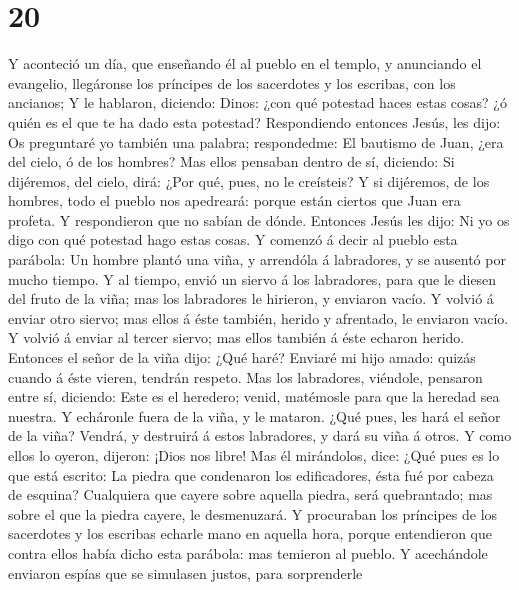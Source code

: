 \hypertarget{section-19}{%
\section{20}\label{section-19}}

 Y aconteció un día, que enseñando él al pueblo en el
templo, y anunciando el evangelio, llegáronse los príncipes de los
sacerdotes y los escribas, con los ancianos;  Y le hablaron,
diciendo: Dinos: ¿con qué potestad haces estas cosas? ¿ó quién es el que
te ha dado esta potestad?  Respondiendo entonces Jesús, les
dijo: Os preguntaré yo también una palabra; respondedme:  El
bautismo de Juan, ¿era del cielo, ó de los hombres?  Mas
ellos pensaban dentro de sí, diciendo: Si dijéremos, del cielo, dirá:
¿Por qué, pues, no le creísteis?  Y si dijéremos, de los
hombres, todo el pueblo nos apedreará: porque están ciertos que Juan era
profeta.  Y respondieron que no sabían de dónde.
 Entonces Jesús les dijo: Ni yo os digo con qué potestad
hago estas cosas.  Y comenzó á decir al pueblo esta
parábola: Un hombre plantó una viña, y arrendóla á labradores, y se
ausentó por mucho tiempo.  Y al tiempo, envió un siervo á
los labradores, para que le diesen del fruto de la viña; mas los
labradores le hirieron, y enviaron vacío.  Y volvió á
enviar otro siervo; mas ellos á éste también, herido y afrentado, le
enviaron vacío.  Y volvió á enviar al tercer siervo; mas
ellos también á éste echaron herido.  Entonces el señor de
la viña dijo: ¿Qué haré? Enviaré mi hijo amado: quizás cuando á éste
vieren, tendrán respeto.  Mas los labradores, viéndole,
pensaron entre sí, diciendo: Este es el heredero; venid, matémosle para
que la heredad sea nuestra.  Y echáronle fuera de la viña,
y le mataron. ¿Qué pues, les hará el señor de la viña? 
Vendrá, y destruirá á estos labradores, y dará su viña á otros. Y como
ellos lo oyeron, dijeron: ¡Dios nos libre!  Mas él
mirándolos, dice: ¿Qué pues es lo que está escrito: La piedra que
condenaron los edificadores, ésta fué por cabeza de esquina?
 Cualquiera que cayere sobre aquella piedra, será
quebrantado; mas sobre el que la piedra cayere, le desmenuzará.
 Y procuraban los príncipes de los sacerdotes y los
escribas echarle mano en aquella hora, porque entendieron que contra
ellos había dicho esta parábola: mas temieron al pueblo.  Y
acechándole enviaron espías que se simulasen justos, para sorprenderle
